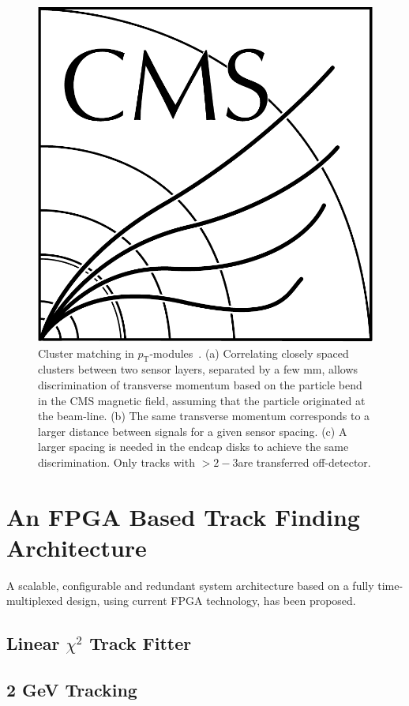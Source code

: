 \begin{figure}[!h]
\centering
\includegraphics[width=5in]{CMS-bw-logo.pdf}
\caption{Cluster matching in $p_\mathrm{T}$-modules~\cite{P2TrackerTDR}. (a) Correlating closely spaced clusters between two sensor layers, separated by a few mm, allows discrimination of transverse momentum based on the particle bend in the CMS magnetic field, assuming that the particle originated at the beam-line. (b) The same transverse momentum corresponds to a larger distance between signals for a given sensor spacing. (c) A larger spacing is needed in the endcap disks to achieve the same discrimination. Only tracks with \pT $> 2-3$\GeVc are transferred off-detector.
}
\label{stubs}
\end{figure}

\section{An FPGA Based Track Finding Architecture}

A scalable, configurable and redundant system architecture based on a fully time-multiplexed design, using current FPGA technology, has been proposed.

\subsection{Linear $\chi^{2}$ Track Fitter}

\subsection{2 GeV Tracking}
